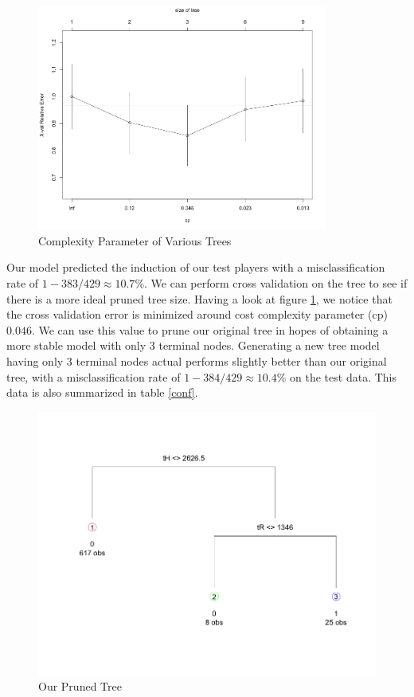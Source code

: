 \documentclass[preprint,12pt]{elsarticle}
\begin{document}
\begin{figure}[h]
       \centering 
       \includegraphics[width=0.85\textwidth]{PlotCP}
       \caption{Complexity Parameter of Various Trees}
       \label{CPlot}
 \end{figure}

Our model predicted the induction of our test players with a misclassification rate of $1 - 383/429 \approx 10.7\%$. We can perform cross validation on the tree to see if there is a more ideal pruned tree size. Having a look at figure \ref{CPlot}, we notice that the cross validation error is minimized around cost complexity parameter (cp) $0.046$. We can use this value to prune our original tree in hopes of obtaining a more stable model with only 3 terminal nodes. Generating a new tree model having only 3 terminal nodes actual performs slightly better than our original tree, with a misclassification rate of $1-384/429 \approx 10.4\%$ on the test data. This data is also summarized in table \ref{conf}.

\begin{figure}[h]
       \centering 
       \includegraphics[width=0.75\linewidth]{BattersPruned}
       \caption{Our Pruned Tree}
       \label{pruned}
 \end{figure}
\end{document}

